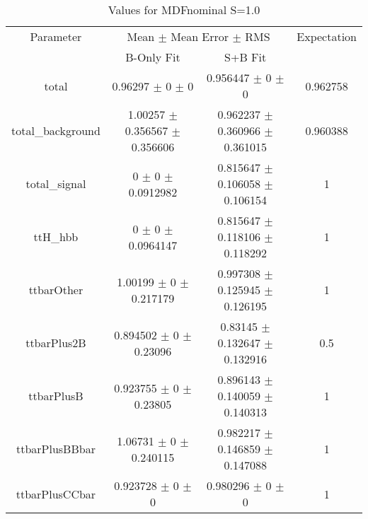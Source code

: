 \begin{table}
\centering
\caption{Values for MDFnominal S=1.0}
\begin{tabular}{cccc}
\toprule
Parameter & \multicolumn{2}{c}{Mean $\pm$ Mean Error $\pm$ RMS} & Expectation\\
 & B-Only Fit & S+B Fit & \\
\midrule
total & \num{0.96297} $\pm$ \num{0} $\pm$ \num{0} & \num{0.956447} $\pm$ \num{0} $\pm$ \num{0} & \num{0.962758}\\
total\_background & \num{1.00257} $\pm$ \num{0.356567} $\pm$ \num{0.356606} & \num{0.962237} $\pm$ \num{0.360966} $\pm$ \num{0.361015} & \num{0.960388}\\
total\_signal & \num{0} $\pm$ \num{0} $\pm$ \num{0.0912982} & \num{0.815647} $\pm$ \num{0.106058} $\pm$ \num{0.106154} & \num{1}\\
ttH\_hbb & \num{0} $\pm$ \num{0} $\pm$ \num{0.0964147} & \num{0.815647} $\pm$ \num{0.118106} $\pm$ \num{0.118292} & \num{1}\\
ttbarOther & \num{1.00199} $\pm$ \num{0} $\pm$ \num{0.217179} & \num{0.997308} $\pm$ \num{0.125945} $\pm$ \num{0.126195} & \num{1}\\
ttbarPlus2B & \num{0.894502} $\pm$ \num{0} $\pm$ \num{0.23096} & \num{0.83145} $\pm$ \num{0.132647} $\pm$ \num{0.132916} & \num{0.5}\\
ttbarPlusB & \num{0.923755} $\pm$ \num{0} $\pm$ \num{0.23805} & \num{0.896143} $\pm$ \num{0.140059} $\pm$ \num{0.140313} & \num{1}\\
ttbarPlusBBbar & \num{1.06731} $\pm$ \num{0} $\pm$ \num{0.240115} & \num{0.982217} $\pm$ \num{0.146859} $\pm$ \num{0.147088} & \num{1}\\
ttbarPlusCCbar & \num{0.923728} $\pm$ \num{0} $\pm$ \num{0} & \num{0.980296} $\pm$ \num{0} $\pm$ \num{0} & \num{1}\\
\bottomrule
\end{tabular}
\end{table}
